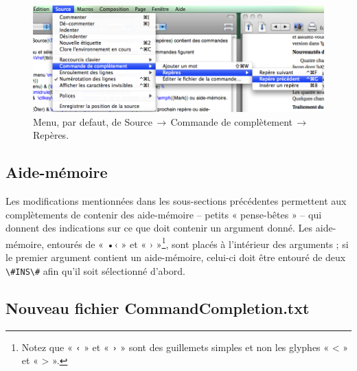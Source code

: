 \documentclass[11pt,french]{article}
\newcommand{\mnu}[1]{\textsf{#1}}
\newcommand{\To}{\,\(\to\)\,}
\newcommand{\CCT}{\textsf{CommandCompletion.txt}}
\begin{document}
\begin{figure}[htbp]
\centering\includegraphics[width=\textwidth]{figs/mark}
\caption{Menu, par defaut, de \mnu{Source}\To\mnu{Commande de complètement}\To\mnu{Repères}.\label{fig:marks}}
\end{figure}

\subsection*{Aide-mémoire}

Les modifications mentionnées dans les sous-sections précédentes permettent aux complètements de contenir des 
aide-mémoire -- petits « pense-bêtes » -- qui donnent des indications sur ce que doit contenir un argument donné. 
Les aide-mémoire, entourés de « •‹ » et « › »\footnote{Notez que « \texttt{‹} » et « \texttt{›} » sont des guillemets simples et non les glyphes « < » et « > ».}, sont placés à l'intérieur des arguments ; si le premier argument contient un aide-mémoire, celui-ci doit être entouré de deux \verb|\#INS\#| afin qu'il soit sélectionné d'abord.


\subsection*{Nouveau fichier \CCT}
\end{document}
